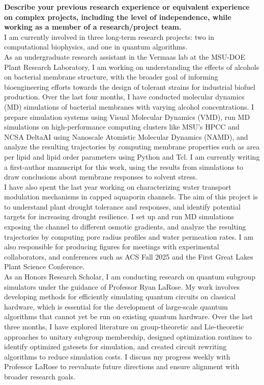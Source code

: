 \documentclass{article}
\begin{document}
\noindent\textbf{Describe your previous research experience or equivalent experience on complex projects, including the level of independence, while working as a member of a research/project team.}
\\

I am currently involved in three long-term research projects: two in computational biophysics, and one
in quantum algorithms. 
\\

As an undergraduate research assistant in the Vermaas lab at the MSU-DOE Plant Research Laboratory,
I am working on understanding the effects of alcohols on bacterial membrane structure, with the broader goal
of informing bioengineering efforts towards the design of tolerant strains for industrial biofuel production.
Over the last four months, I have conducted molecular dynamics (MD) simulations of bacterial
membranes with varying alcohol concentrations. I prepare simulation systems using Visual Molecular Dynamics (VMD), run MD simulations on high-performance computing clusters like MSU’s HPCC and NCSA
DeltaAI using Nanoscale Atomistic Molecular Dynamics (NAMD), and analyze the resulting trajectories by
computing membrane properties such as area per lipid and lipid order parameters
using Python and Tcl. I am currently writing a first-author manuscript for this work, using the results from
simulations to draw conclusions about membrane responses to solvent stress.
\\

I have also spent the last year working on characterizing water transport modulation mechanisms in
capped aquaporin channels. The aim of this project is to understand plant drought tolerance and responses,
and identify potential targets for increasing drought resilience. I set up and run MD simulations exposing the channel to different osmotic gradients, and analyze the resulting trajectories by computing pore radius profiles and water permeation rates. I am also responsible for producing figures for meetings with experimental collaborators, and conferences such as ACS Fall 2025 and the First Great Lakes Plant Science Conference.
\\

As an Honors Research Scholar, I am conducting research on quantum subgroup simulators under the
guidance of Professor Ryan LaRose. My work involves developing methods for efficiently simulating quantum
circuits on classical hardware, which is essential for the development of large-scale quantum
algorithms that cannot yet be run on existing quantum hardware. Over the last three months, I have explored
literature on group-theoretic and Lie-theoretic approaches to unitary subgroup membership, designed optimization routines to identify optimized gatesets for simulation, and created circuit rewriting
algorithms to reduce simulation costs. I discuss my progress weekly with Professor LaRose to reevaluate
future directions and ensure alignment with broader research goals.
\end{document}
